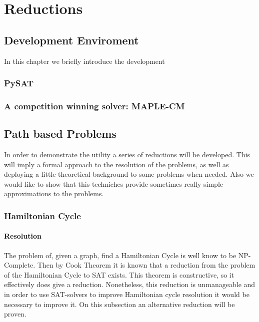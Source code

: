 \part{Reductions} %

\label{chap:3}



\chapter{Development Enviroment}

In this chapter we briefly introduce the development 

\section{PySAT}

\section{A competition winning solver: MAPLE-CM}



\chapter{Path based Problems}


 In order to demonstrate the utility a series of reductions will be developed. This will imply a formal approach to the resolution of the problems, as well as deploying a little theoretical background to some problems when needed. Also we would like to show that this techniches provide sometimes really simple approximations to the problems.\\

\section{Hamiltonian Cycle}
\subsection{Resolution}

The problem of, given a graph, find a Hamiltonian Cycle is well know to be NP-Complete. Then by Cook Theorem it is known that a reduction from the problem of the Hamiltonian Cycle to SAT exists. This theorem is constructive, so it effectively does give a reduction. Nonetheless, this reduction is unmanageable and in order to use SAT-solvers to improve Hamiltonian cycle resolution it would be necessary to improve it. On this subsection an alternative reduction will be proven.

